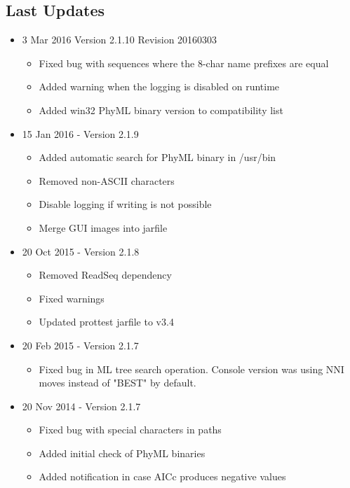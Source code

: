 \subsection{Last Updates}

\begin{itemize}

  \item 3 Mar 2016 Version 2.1.10 Revision 20160303
  \begin{itemize}
    \item Fixed bug with sequences where the 8-char name prefixes are equal
    \item Added warning when the logging is disabled on runtime
    \item Added win32 PhyML binary version to compatibility list
  \end{itemize}

  \item 15 Jan 2016 - Version 2.1.9
  \begin{itemize}
    \item Added automatic search for PhyML binary in /usr/bin
    \item Removed non-ASCII characters
    \item Disable logging if writing is not possible
    \item Merge GUI images into jarfile
  \end{itemize}

  \item 20 Oct 2015 - Version 2.1.8
  \begin{itemize}
    \item Removed ReadSeq dependency
    \item Fixed warnings
    \item Updated prottest jarfile to v3.4
  \end{itemize}


	\item 20 Feb 2015 - Version 2.1.7
	\begin{itemize}
  		\item Fixed bug in ML tree search operation. Console version was using NNI moves instead of "BEST" by default.
	\end{itemize}

	\item 20 Nov 2014 - Version 2.1.7
	\begin{itemize}
		\item Fixed bug with special characters in paths
		\item Added initial check of PhyML binaries
		\item Added notification in case AICc produces negative values
	\end{itemize}


\end{itemize}
